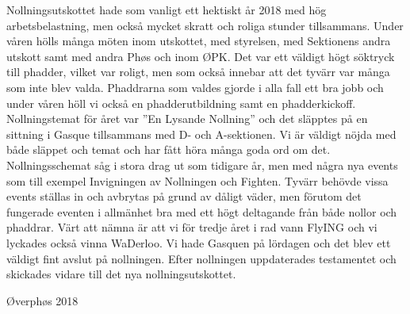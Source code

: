 \documentclass[../_main/handlingar.tex]{subfiles}
\begin{document}

Nollningsutskottet hade som vanligt ett hektiskt år 2018 med hög arbetsbelastning, men också
mycket skratt och roliga stunder tillsammans. Under våren hölls många möten inom utskottet, med
styrelsen, med Sektionens andra utskott samt med andra Phøs och inom ØPK. Det var ett väldigt högt
söktryck till phadder, vilket var roligt, men som också innebar att det tyvärr var många som inte blev
valda. Phaddrarna som valdes gjorde i alla fall ett bra jobb och under våren höll vi också en
phadderutbildning samt en phadderkickoff. Nollningstemat för året var ”En Lysande Nollning” och
det släpptes på en sittning i Gasque tillsammans med D- och A-sektionen. Vi är väldigt nöjda med
både släppet och temat och har fått höra många goda ord om det. Nollningsschemat såg i stora drag
ut som tidigare år, men med några nya events som till exempel Invigningen av Nollningen och
Fighten. Tyvärr behövde vissa events ställas in och avbrytas på grund av dåligt väder, men förutom
det fungerade eventen i allmänhet bra med ett högt deltagande från både nollor och phaddrar. Värt
att nämna är att vi för tredje året i rad vann FlyING och vi lyckades också vinna WaDerloo. Vi hade
Gasquen på lördagen och det blev ett väldigt fint avslut på nollningen.
Efter nollningen uppdaterades testamentet och skickades vidare till det nya nollningsutskottet.

\begin{signatures}{1}
    \mvh
    \signature{Andreas Bennström}{Øverphøs 2018}
\end{signatures}
\end{document}
